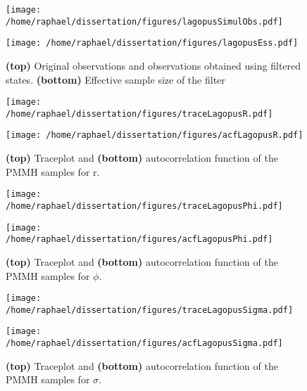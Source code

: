 \documentclass{article}
\begin{document}
	\begin{figure}[htb]
		\centering
		\begin{minipage}{0.9\textwidth}
			\centering
			\texttt{[image: /home/raphael/dissertation/figures/lagopusSimulObs.pdf]}
		\end{minipage}
		\begin{minipage}{0.9\textwidth}
			\centering
			\texttt{[image: /home/raphael/dissertation/figures/lagopusEss.pdf]}
		\end{minipage}
		\caption{\textbf{(top)} Original observations and observations obtained using filtered states. \textbf{(bottom)} Effective sample size of the filter}
		\label{fig:simulObs}
	\end{figure}
	
	
	\begin{figure}[htb]
		\centering
		\begin{minipage}{0.9\textwidth}
			\centering
			\texttt{[image: /home/raphael/dissertation/figures/traceLagopusR.pdf]}
		\end{minipage}
		\begin{minipage}{0.9\textwidth}
			\centering
			\texttt{[image: /home/raphael/dissertation/figures/acfLagopusR.pdf]}
		\end{minipage}
		\caption{\textbf{(top)} Traceplot and \textbf{(bottom)} autocorrelation function of the PMMH samples for r.}
		\label{fig:lagopusR}
	\end{figure}
	
	\begin{figure}[htb]
		\centering
		\begin{minipage}{0.9\textwidth}
			\centering
			\texttt{[image: /home/raphael/dissertation/figures/traceLagopusPhi.pdf]}
		\end{minipage}
		\begin{minipage}{0.9\textwidth}
			\centering
			\texttt{[image: /home/raphael/dissertation/figures/acfLagopusPhi.pdf]}
		\end{minipage}
		\caption{\textbf{(top)} Traceplot and \textbf{(bottom)} autocorrelation function of the PMMH samples for $\phi$.}
		\label{fig:lagopusPhi}
	\end{figure}

	\begin{figure}[htb]
		\centering
		\begin{minipage}{0.9\textwidth}
			\centering
			\texttt{[image: /home/raphael/dissertation/figures/traceLagopusSigma.pdf]}
		\end{minipage}
		\begin{minipage}{0.9\textwidth}
			\centering
			\texttt{[image: /home/raphael/dissertation/figures/acfLagopusSigma.pdf]}
		\end{minipage}
		\caption{\textbf{(top)} Traceplot and \textbf{(bottom)} autocorrelation function of the PMMH samples for $\sigma$.}
		\label{fig:lagopusSigma}
	\end{figure}
	
\end{document}
